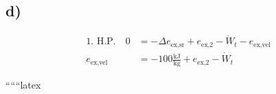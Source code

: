 

\subsection*{d)}
\begin{align*}
\text{1. H.P.} \quad 0 &= -\Delta e_{\text{ex,sr}} + e_{\text{ex,2}} - \dot{W}_t - e_{\text{ex,vel}} \\
e_{\text{ex,vel}} &= -100 \frac{\text{kJ}}{\text{kg}} + e_{\text{ex,2}} - \dot{W}_t
\end{align*}

``````latex